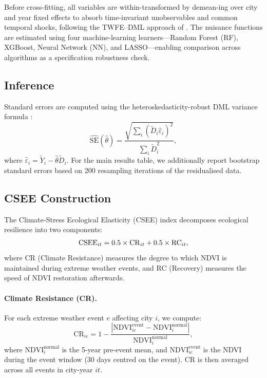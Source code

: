 Before cross-fitting, all variables are within-transformed by
demean-ing over city and year fixed effects to absorb time-invariant
unobservables and common temporal shocks, following the TWFE--DML
approach of \citet{ahrens2024ddml}. The nuisance functions are
estimated using four machine-learning learners---Random Forest (RF),
XGBoost, Neural Network (NN), and LASSO---enabling comparison across
algorithms as a specification robustness check.

\subsection{Inference}

Standard errors are computed using the heteroskedasticity-robust
DML variance formula \citep{chernozhukov2022automatic}:
\begin{equation}
\label{eq:se}
\widehat{\mathrm{SE}}(\hat{\theta}) =
\frac{\sqrt{\sum_i (\tilde{D}_i \hat{\varepsilon}_i)^2}}
     {\sum_i \tilde{D}_i^2},
\end{equation}
where $\hat{\varepsilon}_i = \tilde{Y}_i - \hat{\theta}\tilde{D}_i$.
For the main results table, we additionally report bootstrap standard
errors based on 200 resampling iterations of the residualised data.

\subsection{CSEE Construction}
\label{sec:csee}

The Climate-Stress Ecological Elasticity (CSEE) index decomposes
ecological resilience into two components:
\begin{equation}
\mathrm{CSEE}_{it} = 0.5 \times \mathrm{CR}_{it} + 0.5 \times \mathrm{RC}_{it},
\end{equation}
where CR (Climate Resistance) measures the degree to which NDVI is
maintained during extreme weather events, and RC (Recovery) measures
the speed of NDVI restoration afterwards.

\paragraph{Climate Resistance (CR).}
For each extreme weather event $e$ affecting city $i$, we compute:
\begin{equation}
\mathrm{CR}_{ie} = 1 - \frac{|\mathrm{NDVI}_{ie}^{\mathrm{event}} -
       \mathrm{NDVI}_{i}^{\mathrm{normal}}|}
      {\mathrm{NDVI}_{i}^{\mathrm{normal}}},
\end{equation}
where $\mathrm{NDVI}_{i}^{\mathrm{normal}}$ is the 5-year pre-event
mean, and $\mathrm{NDVI}_{ie}^{\mathrm{event}}$ is the NDVI during the
event window (30 days centred on the event). CR is then averaged across
all events in city-year $it$.

